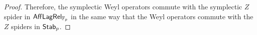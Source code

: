 \begin{proof}
Therefore, the symplectic Weyl operators commute with the symplectic $Z$ spider in $\mathsf{Aff}\mathsf{Lag}\mathsf{Rel}_{\mathbb{F}_p}$ in the same way that the Weyl operators commute with the $Z$ spiders in ${\sf Stab}_p$.

\end{proof}
